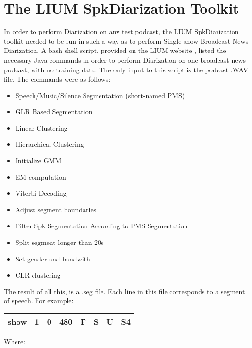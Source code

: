 \section{The LIUM SpkDiarization Toolkit}

\doublespacing


In order to perform Diarization on any test podcast, the LIUM SpkDiarization toolkit needed to be run in such a way as to perform Single-show Broadcast News Diarization. A bash shell script, provided on the LIUM website \cite{LIUMweb}, listed the necessary Java commands in order to perform Diarization on one broadcast news podcast, with no training data. The only input to this script is the podcast .WAV file. The commands were as follows:

\begin{itemize}
\singlespacing
\item{Speech/Music/Silence Segmentation (short-named PMS)}
\item{GLR Based Segmentation}
\item{Linear Clustering}
\item{Hierarchical Clustering}
\item{Initialize GMM}
\item{EM computation}
\item{Viterbi Decoding}
\item{Adjust segment boundaries}
\item{Filter Spk Segmentation According to PMS Segmentation}
\item{Split segment longer than 20s}
\item{Set gender and bandwith}
\item{CLR clustering}
\end{itemize}

\doublespacing
\noindent The result of all this, is a .seg file. Each line in this file corresponds to a segment of speech. For example:

\bgroup
\singlespacing
\def\arraystretch{1.5}
\begin{center}
\begin{tabular}{| c | c | c | c | c | c | c | c |}
\hline
 show & 1 & 0 & 480 & F & S & U & S4 \\
\hline
\end{tabular}
\end{center}
\egroup

\doublespacing
\noindent Where:

